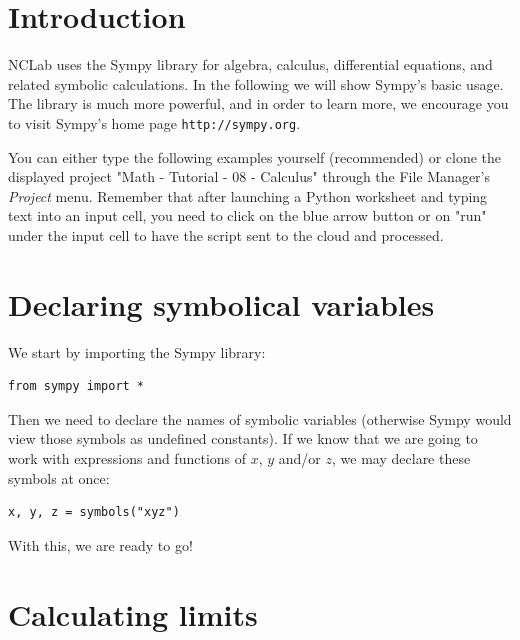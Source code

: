 \documentclass{article}
\begin{document}
\normalsize

\newpage
\setcounter{tocdepth}{2}
\tableofcontents

\newpage

\pagestyle{plain}
\setcounter{page}{1}


\newpage

\pagestyle{plain}


\section{Introduction}

NCLab uses the Sympy library for algebra, calculus, differential equations, and related 
symbolic calculations. In the following we will show Sympy's basic usage. The library 
is much more powerful, and in order to learn more, we encourage you to visit Sympy's
home page {\tt http://sympy.org}. 

You can either type the 
following examples yourself (recommended) or clone the displayed project 
"Math - Tutorial - 08 - Calculus" through the File Manager's
{\em Project} menu. Remember that after launching a Python worksheet and 
typing text into an input cell, you need to click on the blue arrow button 
or on "run" under the input cell to have the script sent to the cloud and 
processed.

\section{Declaring symbolical variables}

We start by importing the Sympy library:

\begin{verbatim}
from sympy import *
\end{verbatim}
Then we need to declare the names of symbolic variables (otherwise Sympy would 
view those symbols as undefined constants). If we know that we are going to work 
with expressions and functions of $x$, $y$ and/or $z$, we may declare these symbols 
at once:
\begin{verbatim}
x, y, z = symbols("xyz")
\end{verbatim}
With this, we are ready to go!

\section{Calculating limits}
\end{document}
